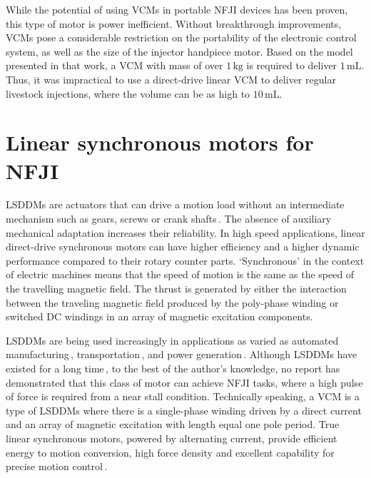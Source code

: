     While the potential of using \acsp{VCM} in portable \acs{NFJI} devices has been proven, this type of motor is power inefficient. Without breakthrough improvements, \acsp{VCM} pose a considerable restriction on the portability of the electronic control system, as well as the size of the injector handpiece motor. Based on the model presented in that work, a \acs{VCM} with mass of over $\mathrm{1\,kg}$ is required to deliver $\mathrm{1\,mL}$. Thus, it was impractical to use a direct-drive linear \acs{VCM} to deliver regular livestock injections, where the volume can be as high to $\mathrm{10\,mL}$. 

\section{Linear synchronous motors for NFJI}        \label{Chapter:background/linear synchronous motors for NFJI}

    
    \acp{LSDDM} are actuators that can drive a motion load without an intermediate mechanism such as gears, screws or crank shafts\,\cite{JacekF.GierasZbigniewJ.Piech2017LinearSystems}. The absence of auxiliary mechanical adaptation increases their reliability. In high speed applications, linear direct-drive synchronous motors can have higher efficiency and a higher dynamic performance compared to their rotary counter parts. ‘Synchronous’ in the context of electric machines means that the speed of motion is the same as the speed of the travelling magnetic field. The thrust is generated by either the interaction between the traveling magnetic field produced by the poly-phase winding or switched DC windings in an array of magnetic excitation components. 
    
    \acsp{LSDDM} are being used increasingly in applications as varied as automated manufacturing\,\cite{Meessen2010Three-dimensionalArray,Overboom2010DesignZ-module}, transportation\,\cite{Gysen2011EfficiencySuspensionb,Cao2012,WenxiangZhao2012DesignApplications}, and power generation\,\cite{Li2011,Baker2019AEnergy}. Although \acsp{LSDDM} have existed for a long time\,\cite{Boldea1997}, to the best of the author’s knowledge, no report has demonstrated that this class of motor can achieve \acs{NFJI} tasks, where a high pulse of force is required from a near stall condition. Technically speaking, a \acs{VCM} is a type of \acsp{LSDDM} where there is a single-phase winding driven by a direct current and an array of magnetic excitation with length equal one pole period. True linear synchronous motors, powered by alternating current, provide efficient energy to motion conversion, high force density and excellent capability for precise motion control\,\cite{Trumper1994,Levi1973,Budig2000}.
    
